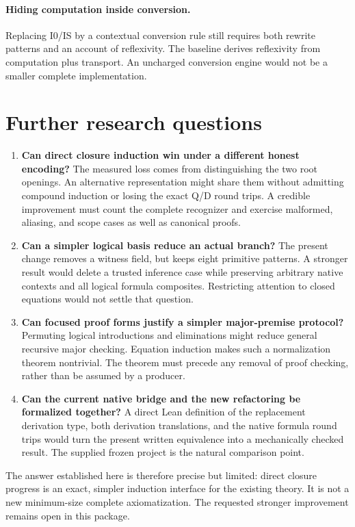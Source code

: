\documentclass[11pt]{article}
\theoremstyle{definition}
\begin{document}
\paragraph{Hiding computation inside conversion.}
Replacing I0/IS by a contextual conversion rule still requires both rewrite
patterns and an account of reflexivity. The baseline derives reflexivity
from computation plus transport. An uncharged conversion engine would not
be a smaller complete implementation.

\section{Further research questions}

\begin{enumerate}
\item \textbf{Can direct closure induction win under a different honest
encoding?} The measured loss comes from distinguishing the two root openings.
An alternative representation might share them without admitting compound
induction or losing the exact Q/D round trips. A credible improvement must
count the complete recognizer and exercise malformed, aliasing, and scope
cases as well as canonical proofs.
\item \textbf{Can a simpler logical basis reduce an actual branch?}
The present change removes a witness field, but keeps eight primitive
patterns. A stronger result would delete a trusted inference case while
preserving arbitrary native contexts and all logical formula composites.
Restricting attention to closed equations would not settle that question.
\item \textbf{Can focused proof forms justify a simpler major-premise
protocol?} Permuting logical introductions and eliminations might reduce
general recursive major checking. Equation induction makes such a
normalization theorem nontrivial. The theorem must precede any removal of
proof checking, rather than be assumed by a producer.
\item \textbf{Can the current native bridge and the new refactoring be
formalized together?} A direct Lean definition of the replacement derivation
type, both derivation translations, and the native formula round trips would
turn the present written equivalence into a mechanically checked result.
The supplied frozen project is the natural comparison point.
\end{enumerate}

The answer established here is therefore precise but limited: direct closure
progress is an exact, simpler induction interface for the existing theory.
It is not a new minimum-size complete axiomatization. The requested stronger
improvement remains open in this package.
\end{document}
